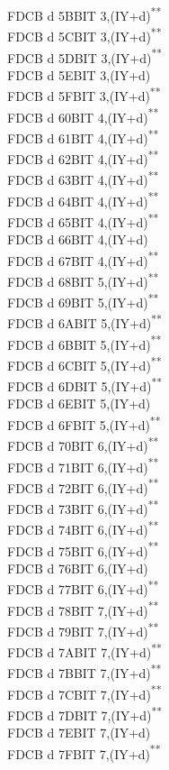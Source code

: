 \documentclass[12pt,twoside,openright,a4paper]{book}
\newcommand{\UNDOC}{\textnormal{\textsuperscript{**}}}
\begin{document}
\begin{multicols}{3}
{\begin{tabbing}
	FDCB d 5B\>BIT 3,(IY+d)\UNDOC\\
	FDCB d 5C\>BIT 3,(IY+d)\UNDOC\\
	FDCB d 5D\>BIT 3,(IY+d)\UNDOC\\
	FDCB d 5E\>BIT 3,(IY+d)\\
	FDCB d 5F\>BIT 3,(IY+d)\UNDOC\\
	FDCB d 60\>BIT 4,(IY+d)\UNDOC\\
	FDCB d 61\>BIT 4,(IY+d)\UNDOC\\
	FDCB d 62\>BIT 4,(IY+d)\UNDOC\\
	FDCB d 63\>BIT 4,(IY+d)\UNDOC\\
	FDCB d 64\>BIT 4,(IY+d)\UNDOC\\
	FDCB d 65\>BIT 4,(IY+d)\UNDOC\\
	FDCB d 66\>BIT 4,(IY+d)\\
	FDCB d 67\>BIT 4,(IY+d)\UNDOC\\
	FDCB d 68\>BIT 5,(IY+d)\UNDOC\\
	FDCB d 69\>BIT 5,(IY+d)\UNDOC\\
	FDCB d 6A\>BIT 5,(IY+d)\UNDOC\\
	FDCB d 6B\>BIT 5,(IY+d)\UNDOC\\
	FDCB d 6C\>BIT 5,(IY+d)\UNDOC\\
	FDCB d 6D\>BIT 5,(IY+d)\UNDOC\\
	FDCB d 6E\>BIT 5,(IY+d)\\
	FDCB d 6F\>BIT 5,(IY+d)\UNDOC\\
	FDCB d 70\>BIT 6,(IY+d)\UNDOC\\
	FDCB d 71\>BIT 6,(IY+d)\UNDOC\\
	FDCB d 72\>BIT 6,(IY+d)\UNDOC\\
	FDCB d 73\>BIT 6,(IY+d)\UNDOC\\
	FDCB d 74\>BIT 6,(IY+d)\UNDOC\\
	FDCB d 75\>BIT 6,(IY+d)\UNDOC\\
	FDCB d 76\>BIT 6,(IY+d)\\
	FDCB d 77\>BIT 6,(IY+d)\UNDOC\\
	FDCB d 78\>BIT 7,(IY+d)\UNDOC\\
	FDCB d 79\>BIT 7,(IY+d)\UNDOC\\
	FDCB d 7A\>BIT 7,(IY+d)\UNDOC\\
	FDCB d 7B\>BIT 7,(IY+d)\UNDOC\\
	FDCB d 7C\>BIT 7,(IY+d)\UNDOC\\
	FDCB d 7D\>BIT 7,(IY+d)\UNDOC\\
	FDCB d 7E\>BIT 7,(IY+d)\\
	FDCB d 7F\>BIT 7,(IY+d)\UNDOC\\

\end{tabbing}}
\end{multicols}
\end{document}
